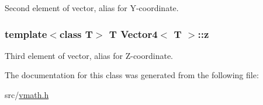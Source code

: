 Second element of vector, alias for Y-\/coordinate. 

\hypertarget{class_vector4_a5a7a1452d661e0b24e4b04c4dbff8ae7}{
\subsubsection[{z}]{\setlength{\rightskip}{0pt plus 5cm}template$<$class T$>$ T {\bf Vector4}$<$ T $>$::{\bf z}}}
\label{class_vector4_a5a7a1452d661e0b24e4b04c4dbff8ae7}


Third element of vector, alias for Z-\/coordinate. 



The documentation for this class was generated from the following file:\begin{DoxyCompactItemize}
\item 
src/\hyperlink{vmath_8h}{vmath.h}\end{DoxyCompactItemize}
